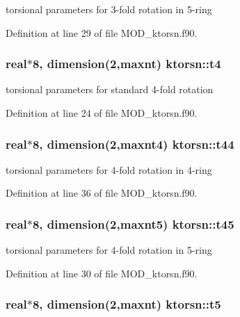 torsional parameters for 3-\/fold rotation in 5-\/ring 



Definition at line 29 of file M\-O\-D\-\_\-ktorsn.\-f90.

\hypertarget{classktorsn_a211e74b9f41c733b130010fdf50cf3f1}{
\subsubsection[{t4}]{\setlength{\rightskip}{0pt plus 5cm}real$\ast$8, dimension(2,{\bf maxnt}) ktorsn\-::t4}}\label{classktorsn_a211e74b9f41c733b130010fdf50cf3f1}


torsional parameters for standard 4-\/fold rotation 



Definition at line 24 of file M\-O\-D\-\_\-ktorsn.\-f90.

\hypertarget{classktorsn_a3174f86ed4ac5953f453f5084ebf8510}{
\subsubsection[{t44}]{\setlength{\rightskip}{0pt plus 5cm}real$\ast$8, dimension(2,{\bf maxnt4}) ktorsn\-::t44}}\label{classktorsn_a3174f86ed4ac5953f453f5084ebf8510}


torsional parameters for 4-\/fold rotation in 4-\/ring 



Definition at line 36 of file M\-O\-D\-\_\-ktorsn.\-f90.

\hypertarget{classktorsn_a2988d45f665461f7ab069c1dfa4eb678}{
\subsubsection[{t45}]{\setlength{\rightskip}{0pt plus 5cm}real$\ast$8, dimension(2,{\bf maxnt5}) ktorsn\-::t45}}\label{classktorsn_a2988d45f665461f7ab069c1dfa4eb678}


torsional parameters for 4-\/fold rotation in 5-\/ring 



Definition at line 30 of file M\-O\-D\-\_\-ktorsn.\-f90.

\hypertarget{classktorsn_a0c28aa237c6d367abf0508ba5112aa54}{
\subsubsection[{t5}]{\setlength{\rightskip}{0pt plus 5cm}real$\ast$8, dimension(2,{\bf maxnt}) ktorsn\-::t5}}\label{classktorsn_a0c28aa237c6d367abf0508ba5112aa54}



